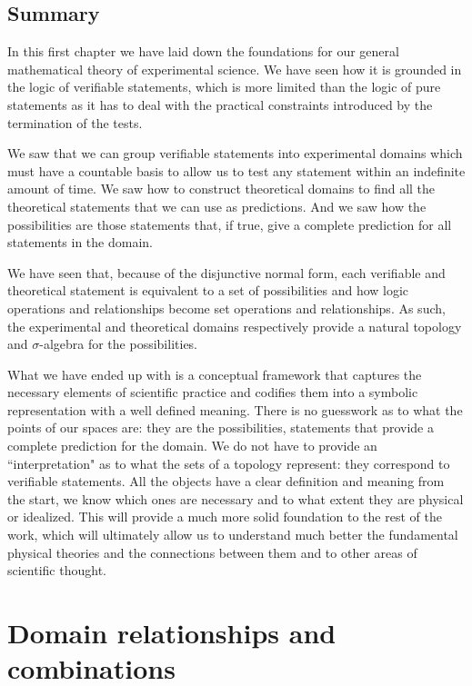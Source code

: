 \documentclass[11pt,letterpaper,fleqn]{memoir} %
\begin{document}
\section{Summary}

In this first chapter we have laid down the foundations for our general mathematical theory of experimental science. We have seen how it is grounded in the logic of verifiable statements, which is more limited than the logic of pure statements as it has to deal with the practical constraints introduced by the termination of the tests.

We saw that we can group verifiable statements into experimental domains which must have a countable basis to allow us to test any statement within an indefinite amount of time. We saw how to construct theoretical domains to find all the theoretical statements that we can use as predictions. And we saw how the possibilities are those statements that, if true, give a complete prediction for all statements in the domain.

We have seen that, because of the disjunctive normal form, each verifiable and theoretical statement is equivalent to a set of possibilities and how logic operations and relationships become set operations and relationships. As such, the experimental and theoretical domains respectively provide a natural topology and $\sigma$-algebra for the possibilities.

What we have ended up with is a conceptual framework that captures the necessary elements of scientific practice and codifies them into a symbolic representation with a well defined meaning. There is no guesswork as to what the points of our spaces are: they are the possibilities, statements that provide a complete prediction for the domain. We do not have to provide an ``interpretation" as to what the sets of a topology represent: they correspond to verifiable statements. All the objects have a clear definition and meaning from the start, we know which ones are necessary and to what extent they are physical or idealized. This will provide a much more solid foundation to the rest of the work, which will ultimately allow us to understand much better the fundamental physical theories and the connections between them and to other areas of scientific thought.

\chapter{Domain relationships and combinations}
\end{document}
